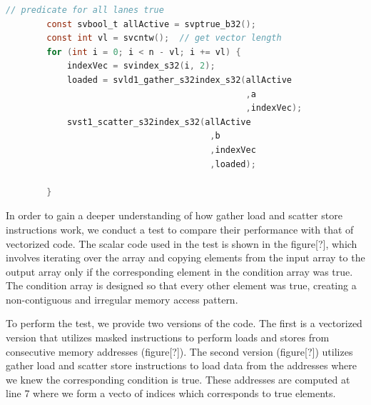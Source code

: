 \documentclass[\main/thesis.tex]{subfiles}
\begin{document}
    \begin{lstlisting}[language=C,caption= Code Using Gather/Scatter]
        // predicate for all lanes true
        const svbool_t allActive = svptrue_b32(); 
        const int vl = svcntw();  // get vector length
        for (int i = 0; i < n - vl; i += vl) {
            indexVec = svindex_s32(i, 2);
            loaded = svld1_gather_s32index_s32(allActive
                                               ,a
                                               ,indexVec);
            svst1_scatter_s32index_s32(allActive
                                        ,b
                                        ,indexVec
                                        ,loaded);
    
        }
    \end{lstlisting}
    

\newpage

In order to gain a deeper understanding of how gather load and scatter store instructions work, we conduct a test to compare their performance with that of vectorized code. The scalar code used in the test is shown in the figure[?], which involves iterating over the array and copying elements from the input array to the output array only if the corresponding element in the condition array was true. The condition array is designed so that every other element was true, creating a non-contiguous and irregular memory access pattern.

To perform the test, we provide two versions of the code. The first is a vectorized version that utilizes masked instructions to perform loads and stores from consecutive memory addresses (figure[?]). The second version (figure[?]) utilizes gather load and scatter store instructions to load data from the addresses where we knew the corresponding condition is true. These addresses are computed at line 7 where we form a vecto of indices which corresponds to true elements.
\end{document}
